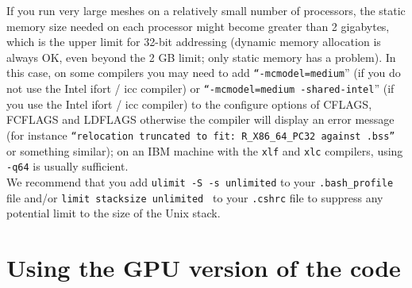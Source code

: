 If you run very large meshes on a relatively small number
of processors, the static memory size needed on each processor might become
greater than 2 gigabytes, which is the upper limit for 32-bit addressing
(dynamic memory allocation is always OK, even beyond the 2 GB limit; only static memory has a problem).
In this case, on some compilers you may need to add \texttt{``-mcmodel=medium}'' (if you do not use the Intel ifort / icc compiler)
or \texttt{``-mcmodel=medium -shared-intel}'' (if you use the Intel ifort / icc compiler)
to the configure options of CFLAGS, FCFLAGS and LDFLAGS otherwise the compiler will display an error
message (for instance \texttt{``relocation truncated to fit: R\_X86\_64\_PC32 against .bss''} or something similar);
on an IBM machine with the \texttt{xlf} and \texttt{xlc} compilers, using \texttt{-q64} is usually sufficient.\\


We recommend that you add {\texttt{ulimit -S -s unlimited}} to your {\texttt{.bash\_profile}} file and/or {\texttt{limit stacksize unlimited }} to your {\texttt{.cshrc}} file to suppress any potential limit to the size of the Unix stack.\\


\section{Using the GPU version of the code}

